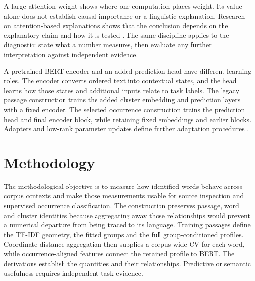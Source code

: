 \documentclass[10pt,letterpaper]{article}
\begin{document}
A large attention weight shows where one computation places weight. Its value alone does not establish causal importance or a linguistic explanation. Research on attention-based explanations shows that the conclusion depends on the explanatory claim and how it is tested \cite{jain,wiegreffe}. The same discipline applies to the diagnostic: state what a number measures, then evaluate any further interpretation against independent evidence.\par

A pretrained BERT encoder and an added prediction head have different learning roles. The encoder converts ordered text into contextual states, and the head learns how those states and additional inputs relate to task labels. The legacy passage construction trains the added cluster embedding and prediction layers with a fixed encoder. The selected occurrence construction trains the prediction head and final encoder block, while retaining fixed embeddings and earlier blocks. Adapters and low-rank parameter updates define further adaptation procedures \cite{bert,adapters,lora}.\par

\section{Methodology}
The methodological objective is to measure how identified words behave across corpus contexts and make those measurements usable for source inspection and supervised occurrence classification. The construction preserves passage, word and cluster identities because aggregating away those relationships would prevent a numerical departure from being traced to its language. Training passages define the TF-IDF geometry, the fitted groups and the full group-conditioned profiles. Coordinate-distance aggregation then supplies a corpus-wide CV for each word, while occurrence-aligned features connect the retained profile to BERT. The derivations establish the quantities and their relationships. Predictive or semantic usefulness requires independent task evidence.\par
\end{document}
